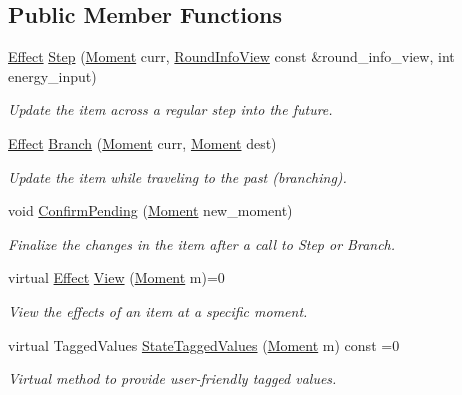 \subsection*{Public Member Functions}
\begin{DoxyCompactItemize}
\item 
\hyperlink{classitem_1_1_effect}{Effect} \hyperlink{classitem_1_1_item_ad8d77979820782fd86a0a67e2ea25c75}{Step} (\hyperlink{classtimeplane_1_1_moment}{Moment} curr, \hyperlink{classroundinfo_1_1_round_info_view}{Round\+Info\+View} const \&round\+\_\+info\+\_\+view, int energy\+\_\+input)
\begin{DoxyCompactList}\small\item\em Update the item across a regular step into the future. \end{DoxyCompactList}\item 
\hyperlink{classitem_1_1_effect}{Effect} \hyperlink{classitem_1_1_item_aa4b1c982b6d35d047c7a8ea86b06be99}{Branch} (\hyperlink{classtimeplane_1_1_moment}{Moment} curr, \hyperlink{classtimeplane_1_1_moment}{Moment} dest)
\begin{DoxyCompactList}\small\item\em Update the item while traveling to the past (branching). \end{DoxyCompactList}\item 
void \hyperlink{classitem_1_1_item_a99eaccdd31a817a7cb0e501cb632f711}{Confirm\+Pending} (\hyperlink{classtimeplane_1_1_moment}{Moment} new\+\_\+moment)
\begin{DoxyCompactList}\small\item\em Finalize the changes in the item after a call to {\ttfamily Step} or {\ttfamily Branch}. \end{DoxyCompactList}\item 
virtual \hyperlink{classitem_1_1_effect}{Effect} \hyperlink{classitem_1_1_item_a400dfeabc4056d36bfd348ff9c51cf7d}{View} (\hyperlink{classtimeplane_1_1_moment}{Moment} m)=0
\begin{DoxyCompactList}\small\item\em View the effects of an item at a specific moment. \end{DoxyCompactList}\item 
virtual Tagged\+Values \hyperlink{classitem_1_1_item_a8410ab3ab75e65360eddb4f6bd3cceff}{State\+Tagged\+Values} (\hyperlink{classtimeplane_1_1_moment}{Moment} m) const =0
\begin{DoxyCompactList}\small\item\em Virtual method to provide user-\/friendly tagged values. \end{DoxyCompactList}\end{DoxyCompactItemize}
